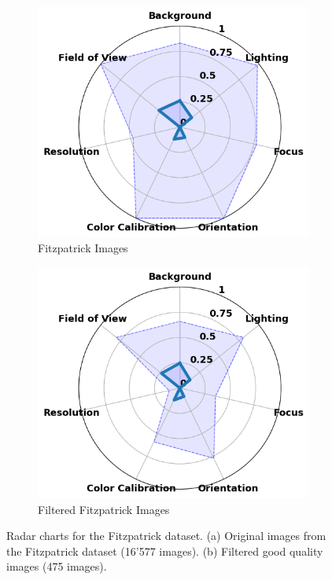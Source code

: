 \begin{figure}[ht]
    \centering
    \begin{subfigure}[b]{0.48\textwidth}
        \includegraphics[width=\textwidth]{img/hept/Fitzpatrick17k.png}
        \caption{Fitzpatrick Images}
        \label{fig:Fitzpatrick17K}
    \end{subfigure}
    \hfill
    \begin{subfigure}[b]{0.48\textwidth}
        \includegraphics[width=\textwidth]{img/hept/F17K.png}
        \caption{Filtered Fitzpatrick Images}
        \label{fig:F17K}
    \end{subfigure}
    \hfill
    \caption{Radar charts for the Fitzpatrick dataset. (a) Original images from the Fitzpatrick dataset (16'577 images). (b) Filtered good quality images (475 images).}
    \label{fig:FF}
\end{figure}
